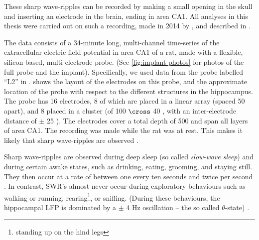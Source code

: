 
These sharp wave-ripples can be recorded by making a small opening in the skull and inserting an electrode in the brain, ending in area CA1. All analyses in this thesis were carried out on such a recording, made in 2014 by \citeauthor*{Michon2016}, and described in .

The data consists of a 34-minute long, multi-channel time-series of the extracellular electric field potential in area CA1 of a rat, made with a flexible, silicon-based, multi-electrode probe. (See \cref{fig:implant-photos} for photos of the full probe and the implant). Specifically, we used data from the probe labelled ``L2'' in \cite{Michon2016}.  shows the layout of the electrodes on this probe, and the approximate location of the probe with respect to the different structures in the hippocampus. The probe has 16 electrodes, 8 of which are placed in a linear array (spaced 50 \um{} apart), and 8 placed in a cluster (of 100 \um{} $\cross$ 40 \um{}, with an inter-electrode distance of $\pm$ 25 \um{}). The electrodes cover a total depth of 500 \um{} and span all layers of area CA1.
The recording was made while the rat was at rest. This makes it likely that  sharp wave-ripples are observed \cite{Buzsaki2015}. 




Sharp wave-ripples are observed during deep sleep (so called \emph{slow-wave sleep}) and during certain awake states, such as drinking, eating, grooming, and staying still. They then occur at a rate of between one every ten seconds and twice per second \cite{Girardeau2011}. In contrast, SWR's almost never occur during exploratory behaviours such as walking or running, rearing\footnote{standing up on the hind legs}, or sniffing. (During these behaviours, the hippocampal LFP is dominated by a $\pm$ 4 Hz oscillation -- the so called $\theta$-state) \cite{Buzsaki2015}.



\label{sec:science}


